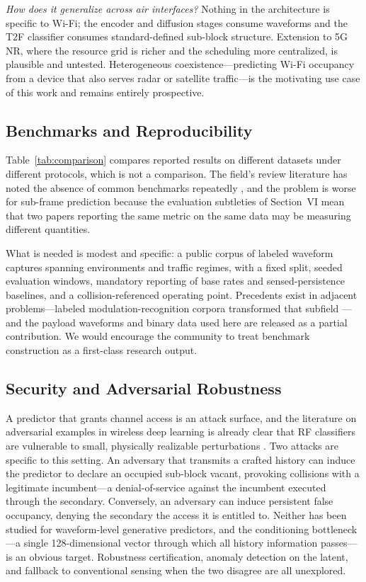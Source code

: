 \documentclass[lettersize,journal]{IEEEtran}
\begin{document}
\emph{How does it generalize across air interfaces?} Nothing in the
architecture is specific to Wi-Fi; the encoder and diffusion stages
consume waveforms and the T2F classifier consumes standard-defined
sub-block structure. Extension to 5G NR, where the resource grid is
richer and the scheduling more centralized, is plausible and untested.
Heterogeneous coexistence---predicting Wi-Fi occupancy from a device
that also serves radar or satellite traffic---is the motivating use case
of this work and remains entirely prospective.

\subsection{\textbf{Benchmarks and Reproducibility}}
Table~\ref{tab:comparison} compares reported results on different
datasets under different protocols, which is not a comparison. The
field's review literature has noted the absence of common benchmarks
repeatedly \cite{Suriya2022,Wu2017,Tidjani2019,Eltom2018}, and the
problem is worse for sub-frame prediction because the evaluation
subtleties of Section~VI mean that two papers reporting the same metric
on the same data may be measuring different quantities.

What is needed is modest and specific: a public corpus of labeled
waveform captures spanning environments and traffic regimes, with a
fixed split, seeded evaluation windows, mandatory reporting of base
rates and sensed-persistence baselines, and a collision-referenced
operating point. Precedents exist in adjacent problems---labeled
modulation-recognition corpora transformed that subfield
\cite{OShea2018}---and the payload waveforms and binary data used here
are released \cite{PayloadData} as a partial contribution. We would
encourage the community to treat benchmark construction as a
first-class research output.

\subsection{\textbf{Security and Adversarial Robustness}}
A predictor that grants channel access is an attack surface, and the
literature on adversarial examples in wireless deep learning is already
clear that RF classifiers are vulnerable to small, physically realizable
perturbations \cite{Sadeghi2019}. Two attacks are specific to this
setting. An adversary that transmits a crafted history can induce the
predictor to declare an occupied sub-block vacant, provoking collisions
with a legitimate incumbent---a denial-of-service against the incumbent
executed through the secondary. Conversely, an adversary can induce
persistent false occupancy, denying the secondary the access it is
entitled to. Neither has been studied for waveform-level generative
predictors, and the conditioning bottleneck---a single 128-dimensional
vector through which all history information passes---is an obvious
target. Robustness certification, anomaly detection on the latent, and
fallback to conventional sensing when the two disagree are all
unexplored.
\end{document}
